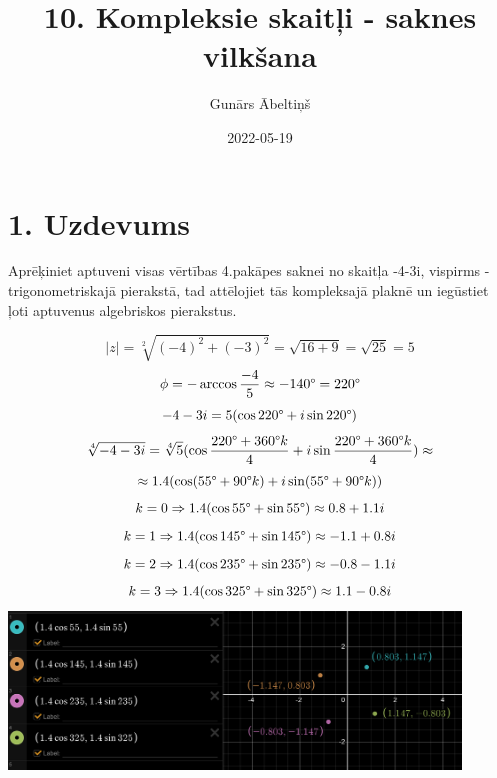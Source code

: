 \documentclass{article}
\title{10. Kompleksie skaitļi - saknes vilkšana}
\author{Gunārs Ābeltiņš}
\date{2022-05-19}
\begin{document}
\maketitle

\section*{1. Uzdevums}
Aprēķiniet aptuveni visas vērtības 4.pakāpes saknei no skaitļa -4-3i, vispirms -  trigonometriskajā pierakstā, tad attēlojiet tās kompleksajā plaknē un iegūstiet ļoti aptuvenus algebriskos pierakstus.

\begin{equation*}
    |z| = \sqrt[2]{(-4)^2 + (-3)^2} = \sqrt{16 + 9} = \sqrt{25} = 5
\end{equation*}
\begin{equation*}
    \phi = - \arccos \frac{-4}{5} \approx - 140 \degree = 220 \degree
\end{equation*}
\begin{equation*}
    -4 - 3i = 5(\cos 220 \degree + i \sin 220 \degree)
\end{equation*}
\begin{equation*}
    \sqrt[4]{-4 - 3i} = \sqrt[4]{5}(\cos \frac{220 \degree + 360 \degree k}{4} + i \sin \frac{220 \degree + 360 \degree k}{4}) \approx
\end{equation*}
\begin{equation*}
    \approx 1.4(\cos (55 \degree + 90 \degree k) + i \sin (55 \degree + 90 \degree k))
\end{equation*}
\begin{equation*}
    k = 0 \Rightarrow 1.4 (\cos 55 \degree + \sin 55 \degree) \approx 0.8 + 1.1i
\end{equation*}
\begin{equation*}
    k = 1 \Rightarrow 1.4 (\cos 145 \degree + \sin 145 \degree) \approx -1.1 + 0.8i
\end{equation*}
\begin{equation*}
    k = 2 \Rightarrow 1.4 (\cos 235 \degree + \sin 235 \degree) \approx -0.8 - 1.1i
\end{equation*}
\begin{equation*}
    k = 3 \Rightarrow 1.4 (\cos 325 \degree + \sin 325 \degree) \approx 1.1 - 0.8i
\end{equation*}
\includegraphics[width=0.9\textwidth, center]{1}
\end{document}
